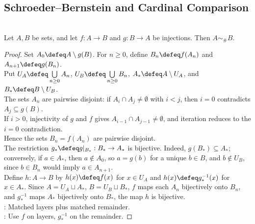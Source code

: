 \subsection{Schroeder--Bernstein and Cardinal Comparison}

\begin{theorem} \label{thm:schroeder-bernstein} \\
Let $A,B$ be sets, and let $f:A\to B$ and $g:B\to A$ be injections. Then $A\sim_{\#}B$.
\begin{proof} Set $A_0\defeq A\setminus g(B)$. For $n\geq0$, define $B_n\defeq f(A_n)$ and $A_{n+1}\defeq g(B_n)$.\\
Put $U_A\defeq\bigcup\limits_{n\geq0}A_n$, $U_B\defeq\bigcup\limits_{n\geq0}B_n$, $A_*\defeq A\setminus U_A$, and $B_*\defeq B\setminus U_B$.\\
The sets $A_n$ are pairwise disjoint: if $A_i\cap A_j\neq\emptyset$ with $i<j$, then $i=0$ contradicts $A_j\subseteq g(B)$.\\
If $i>0$, injectivity of $g$ and $f$ gives $A_{i-1}\cap A_{j-1}\neq\emptyset$, and iteration reduces to the $i=0$ contradiction.\\
Hence the sets $B_n=f(A_n)$ are pairwise disjoint.\\
The restriction $g_*\defeq g|_{B_*}:B_*\to A_*$ is bijective. Indeed, $g(B_*)\subseteq A_*$; conversely, if $a\in A_*$, then $a\notin A_0$, so $a=g(b)$ for a unique $b\in B$, and $b\notin U_B$, since $b\in B_n$ would imply $a\in A_{n+1}$.\\
Define $h:A\to B$ by $h(x)\defeq f(x)$ for $x\in U_A$ and $h(x)\defeq g_*^{-1}(x)$ for $x\in A_*$. Since $A=U_A\sqcup A_*$, $B=U_B\sqcup B_*$, $f$ maps each $A_n$ bijectively onto $B_n$, and $g_*^{-1}$ maps $A_*$ bijectively onto $B_*$, the map $h$ is bijective.\\
: Matched layers plus matched remainder.\\
: Use $f$ on layers, $g_*^{-1}$ on the remainder.
\end{proof}
\end{theorem}

